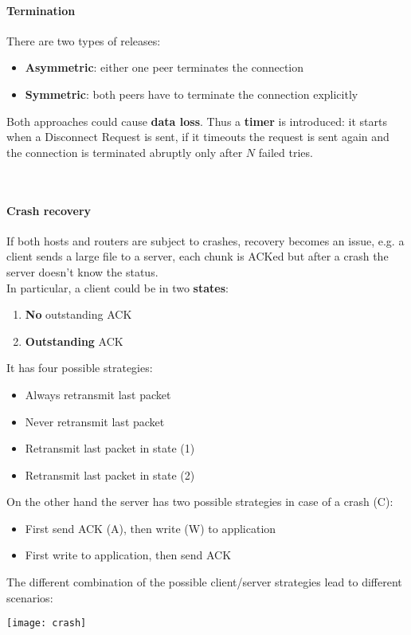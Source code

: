 \paragraph{Termination} There are two types of releases:
\begin{itemize}
	\item \textbf{Asymmetric}: either one peer terminates the connection
	\item \textbf{Symmetric}: both peers have to terminate the connection explicitly
\end{itemize}
Both approaches could cause \textbf{data loss}. Thus a \textbf{timer} is introduced: it starts when a Disconnect Request is sent, if it timeouts the request is sent again and the connection is terminated abruptly only after $N$ failed tries.

\begin{figure}[!h]
	\centering
	\hfil
	\\
	\hfil
\end{figure}

\paragraph{Crash recovery} If both hosts and routers are subject to crashes, recovery becomes an issue, e.g. a client sends a large file to a server, each chunk is ACKed but after a crash the server doesn't know the status.\\
In particular, a client could be in two \textbf{states}:
\begin{enumerate}
	\item \textbf{No} outstanding ACK
	\item \textbf{Outstanding} ACK
\end{enumerate}
It has four possible strategies:
\begin{itemize}
	\item Always retransmit last packet
	\item Never retransmit last packet
	\item Retransmit last packet in state (1)
	\item Retransmit last packet in state (2)
\end{itemize}
On the other hand the server has two possible strategies in case of a  crash (C):
\begin{itemize}
	\item First send ACK (A), then write (W) to application
	\item First write to application, then send ACK
\end{itemize}
The different combination of the possible client/server strategies lead to different scenarios:
\begin{center}
	\texttt{[image: crash]}
\end{center}

